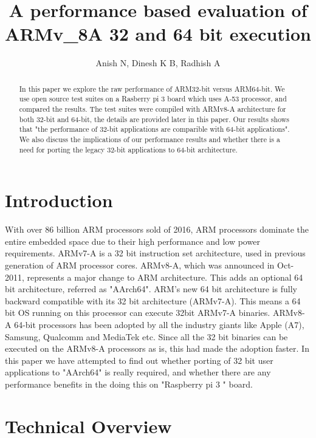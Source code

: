 \documentclass[journal]{IEEEtran}
\begin{document}
\title{A performance based evaluation of ARMv\_8A 32 and 64 bit execution}
\author{Anish N, Dinesh K B, Radhish A}

\maketitle

\begin{abstract}
In this paper we explore the raw performance of ARM32-bit versus ARM64-bit.  We use open source test suites on a Rasberry pi 3 board which uses A-53 processor, and compared the results.  The test suites were compiled with ARMv8-A architecture for both 32-bit and 64-bit, the details are provided later in this paper.  Our results shows that "the performance of 32-bit applications are comparible with 64-bit applications".  We also discuss the implications of our performance results and whether there is a need for porting the legacy 32-bit applications to 64-bit architecture.
\end{abstract}

\section{Introduction}
With over 86 billion ARM processors sold of 2016, ARM processors dominate the entire embedded space due to their high performance and low power requirements.  ARMv7-A is a 32 bit instruction set architecture, used in previous generation of ARM processor cores.  ARMv8-A, which was announced in Oct-2011, represents a major change to ARM architecture.  This adds an optional 64 bit architecture, referred as "AArch64". ARM's new 64 bit architecture is fully backward compatible with its 32 bit architecture (ARMv7-A). This means a 64 bit OS running on this processor can execute 32bit ARMv7-A binaries.  ARMv8-A 64-bit processors has been adopted by all the industry giants like Apple (A7), Samsung, Qualcomm and MediaTek etc.  Since all the 32 bit binaries can be executed on the ARMv8-A processors as is, this had made the adoption faster.  In this paper we have attempted to find out whether porting of 32 bit user applications to "AArch64" is really required, and whether there are any performance benefits in the doing this on "Raspberry pi 3 " board.


\section{Technical Overview}
\end{document}
